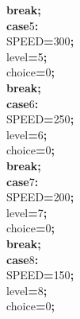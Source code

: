 \documentclass[a4paper, 10pt]{article}
\newcommand\SPC{\hspace*{0.6em}}
\newcommand{\CppAIdentifier}[1]{#1}
\newcommand{\CppANumber}[1]{\textcolor[rgb]{0.5,0,0.5}{#1}}
\newcommand{\CppAReservedWord}[1]{\textbf{#1}}
\newcommand{\CppASpace}[1]{\colorbox[rgb]{1,1,1}{#1}}
\newcommand{\CppASymbol}[1]{\textbf{\textcolor[rgb]{1,0,0}{#1}}}
\begin{document}
\begin{ttfamily}
\CppASpace{\SPC \SPC \SPC \SPC }\CppAReservedWord{break}\CppASymbol{;}\\
\CppASpace{\SPC \SPC \SPC \SPC }\CppAReservedWord{case}\CppASpace{\SPC }\CppANumber{5}\CppASymbol{:}\\
\CppASpace{\SPC \SPC \SPC \SPC }\CppAIdentifier{SPEED}\CppASymbol{=}\CppANumber{300}\CppASymbol{;}\\
\CppASpace{\SPC \SPC \SPC \SPC }\CppAIdentifier{level}\CppASymbol{=}\CppANumber{5}\CppASymbol{;}\\
\CppASpace{\SPC \SPC \SPC \SPC }\CppAIdentifier{choice}\CppASymbol{=}\CppANumber{0}\CppASymbol{;}\\
\CppASpace{\SPC \SPC \SPC \SPC }\CppAReservedWord{break}\CppASymbol{;}\\
\CppASpace{\SPC \SPC \SPC \SPC }\CppAReservedWord{case}\CppASpace{\SPC }\CppANumber{6}\CppASymbol{:}\\
\CppASpace{\SPC \SPC \SPC \SPC }\CppAIdentifier{SPEED}\CppASymbol{=}\CppANumber{250}\CppASymbol{;}\\
\CppASpace{\SPC \SPC \SPC \SPC }\CppAIdentifier{level}\CppASymbol{=}\CppANumber{6}\CppASymbol{;}\\
\CppASpace{\SPC \SPC \SPC \SPC }\CppAIdentifier{choice}\CppASymbol{=}\CppANumber{0}\CppASymbol{;}\\
\CppASpace{\SPC \SPC \SPC \SPC }\CppAReservedWord{break}\CppASymbol{;}\\
\CppASpace{\SPC \SPC \SPC \SPC }\CppAReservedWord{case}\CppASpace{\SPC }\CppANumber{7}\CppASymbol{:}\\
\CppASpace{\SPC \SPC \SPC \SPC }\CppAIdentifier{SPEED}\CppASymbol{=}\CppANumber{200}\CppASymbol{;}\\
\CppASpace{\SPC \SPC \SPC \SPC }\CppAIdentifier{level}\CppASymbol{=}\CppANumber{7}\CppASymbol{;}\\
\CppASpace{\SPC \SPC \SPC \SPC }\CppAIdentifier{choice}\CppASymbol{=}\CppANumber{0}\CppASymbol{;}\\
\CppASpace{\SPC \SPC \SPC \SPC }\CppAReservedWord{break}\CppASymbol{;}\\
\CppASpace{\SPC \SPC \SPC \SPC }\CppAReservedWord{case}\CppASpace{\SPC }\CppANumber{8}\CppASymbol{:}\\
\CppASpace{\SPC \SPC \SPC \SPC }\CppAIdentifier{SPEED}\CppASymbol{=}\CppANumber{150}\CppASymbol{;}\\
\CppASpace{\SPC \SPC \SPC \SPC }\CppAIdentifier{level}\CppASymbol{=}\CppANumber{8}\CppASymbol{;}\\
\CppASpace{\SPC \SPC \SPC \SPC }\CppAIdentifier{choice}\CppASymbol{=}\CppANumber{0}\CppASymbol{;}\\

\end{ttfamily}
\end{document}

